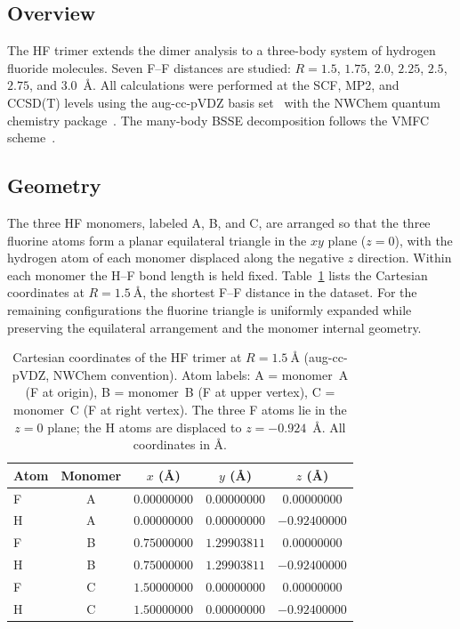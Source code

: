 \subsection{Overview}

The HF trimer extends the dimer analysis to a three-body system of
hydrogen fluoride molecules. Seven F--F distances are studied:
$R = 1.5$, $1.75$, $2.0$, $2.25$, $2.5$, $2.75$, and
\SI{3.0}{\angstrom}. All calculations were performed at the SCF, MP2,
and CCSD(T) levels using the aug-cc-pVDZ basis
set~\cite{dunning1989,kendall1992} with the NWChem quantum chemistry
package~\cite{nwchem2020}. The many-body BSSE decomposition follows
the VMFC scheme~\cite{valiron1997}.

\subsection{Geometry}

The three HF monomers, labeled A, B, and C, are arranged so that the
three fluorine atoms form a planar equilateral triangle in the $xy$
plane ($z = 0$), with the hydrogen atom of each monomer displaced
along the negative $z$ direction. Within each monomer the H--F bond
length is held fixed. Table~\ref{tab:hf_trimer_geometry} lists the
Cartesian coordinates at $R = \SI{1.5}{\angstrom}$, the shortest F--F
distance in the dataset. For the remaining configurations the
fluorine triangle is uniformly expanded while preserving the
equilateral arrangement and the monomer internal geometry.

\begin{table}[!ht]
    \centering
    \caption{Cartesian coordinates of the HF trimer at
    $R = \SI{1.5}{\angstrom}$ (aug-cc-pVDZ, NWChem convention).
    Atom labels: A = monomer~A (F at origin), B = monomer~B
    (F at upper vertex), C = monomer~C (F at right vertex).
    The three F atoms lie in the $z = 0$ plane; the H atoms are
    displaced to $z = -0.924$~\AA. All coordinates in \AA.}
    \label{tab:hf_trimer_geometry}
    \begin{tabular}{lcccc}
        \toprule
        Atom & Monomer & $x$ (\AA) & $y$ (\AA) & $z$ (\AA) \\
        \midrule
        F & A & $0.00000000$ & $0.00000000$ & $ 0.00000000$ \\
        H & A & $0.00000000$ & $0.00000000$ & $-0.92400000$ \\
        F & B & $0.75000000$ & $1.29903811$ & $ 0.00000000$ \\
        H & B & $0.75000000$ & $1.29903811$ & $-0.92400000$ \\
        F & C & $1.50000000$ & $0.00000000$ & $ 0.00000000$ \\
        H & C & $1.50000000$ & $0.00000000$ & $-0.92400000$ \\
        \bottomrule
    \end{tabular}
\end{table}

